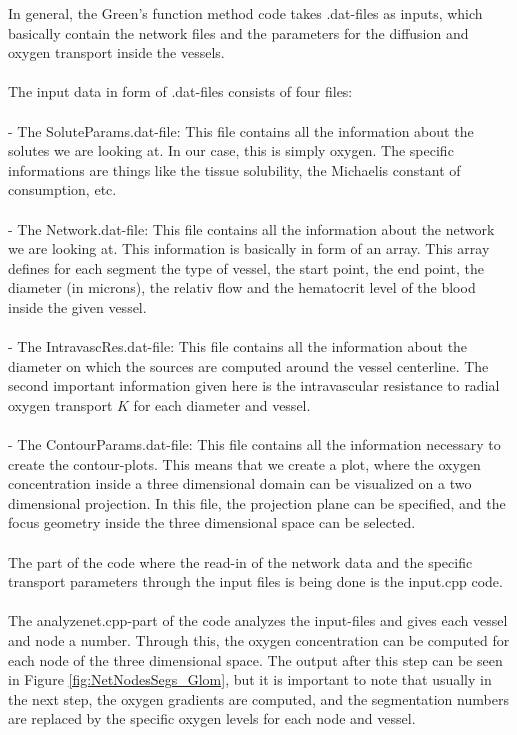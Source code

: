 In general, the Green's function method code takes .dat-files as inputs, which basically contain the network files and the parameters for the diffusion and oxygen transport inside the vessels.
\\
\\The input data in form of .dat-files consists of four files:\\
\\- The SoluteParams.dat-file: This file contains all the information about the solutes we are looking at. In our case, this is simply oxygen. The specific informations are things like the tissue solubility, the Michaelis constant of consumption, etc.\\
\\- The Network.dat-file: This file contains all the information about the network we are looking at. This information is basically in form of an array. This array defines for each segment the type of vessel, the start point, the end point, the diameter (in microns), the relativ flow and the hematocrit level of the blood inside the given vessel.\\
\\- The IntravascRes.dat-file: This file contains all the information about the diameter on which the sources are computed around the vessel centerline. The second important information given here is the intravascular resistance to radial oxygen transport $K$ for each diameter and vessel.\\
\\- The ContourParams.dat-file: This file contains all the information necessary to create the contour-plots. This means that we create a plot, where the oxygen concentration inside a three dimensional domain can be visualized on a two dimensional projection. In this file, the projection plane can be specified, and the focus geometry inside the three dimensional space can be selected.
\\
\\The part of the code where the read-in of the network data and the specific transport parameters through the input files is being done is the input.cpp code.
\\
\\The analyzenet.cpp-part of the code analyzes the input-files and gives each vessel and node a number. Through this, the oxygen concentration can be computed for each node of the three dimensional space. The output after this step can be seen in Figure \ref{fig:NetNodesSegs_Glom}, but it is important to note that usually in the next step, the oxygen gradients are computed, and the segmentation numbers are replaced by the specific oxygen levels for each node and vessel.

